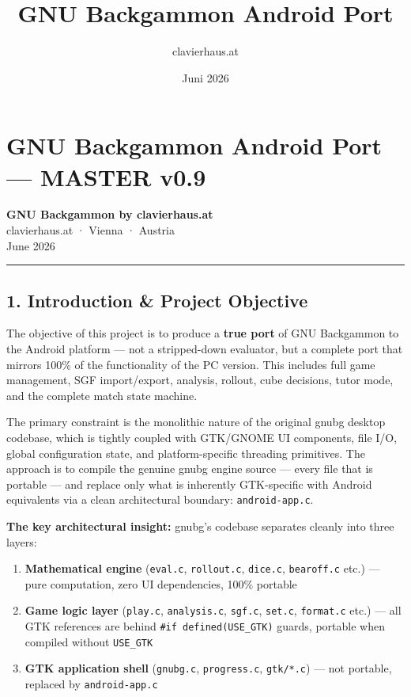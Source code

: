 \documentclass[11pt,a4paper]{article}
\title{\textbf{GNU Backgammon Android Port}}
\author{clavierhaus.at}
\date{Juni 2026}
\providecommand{\tightlist}{\setlength{\itemsep}{2pt}\setlength{\parskip}{0pt}}
\begin{document}
\maketitle\thispagestyle{fancy}

\tableofcontents\newpage

\section{GNU Backgammon Android Port --- MASTER v0.9}\label{gnu-backgammon-android-port-master-v09}

\textbf{GNU Backgammon by clavierhaus.at}\\
clavierhaus.at · Vienna · Austria\\
June 2026

\begin{center}\rule{0.5\linewidth}{0.5pt}\end{center}

\subsection{1. Introduction \& Project
Objective}\label{introduction-project-objective}

The objective of this project is to produce a \textbf{true port} of GNU
Backgammon to the Android platform --- not a stripped-down evaluator,
but a complete port that mirrors 100\% of the functionality of the PC
version. This includes full game management, SGF import/export,
analysis, rollout, cube decisions, tutor mode, and the complete match
state machine.

The primary constraint is the monolithic nature of the original gnubg
desktop codebase, which is tightly coupled with GTK/GNOME UI components,
file I/O, global configuration state, and platform-specific threading
primitives. The approach is to compile the genuine gnubg engine source
--- every file that is portable --- and replace only what is inherently
GTK-specific with Android equivalents via a clean architectural
boundary: \texttt{android-app.c}.

\textbf{The key architectural insight:} gnubg's codebase separates
cleanly into three layers:

\begin{enumerate}
\def\labelenumi{\arabic{enumi}.}
\tightlist
\item
  \textbf{Mathematical engine} (\texttt{eval.c}, \texttt{rollout.c},
  \texttt{dice.c}, \texttt{bearoff.c} etc.) --- pure computation, zero
  UI dependencies, 100\% portable
\item
  \textbf{Game logic layer} (\texttt{play.c}, \texttt{analysis.c},
  \texttt{sgf.c}, \texttt{set.c}, \texttt{format.c} etc.) --- all GTK
  references are behind \texttt{\#if\ defined(USE\_GTK)} guards,
  portable when compiled without \texttt{USE\_GTK}
\item
  \textbf{GTK application shell} (\texttt{gnubg.c}, \texttt{progress.c},
  \texttt{gtk/*.c}) --- not portable, replaced by \texttt{android-app.c}
\end{enumerate}
\end{document}
